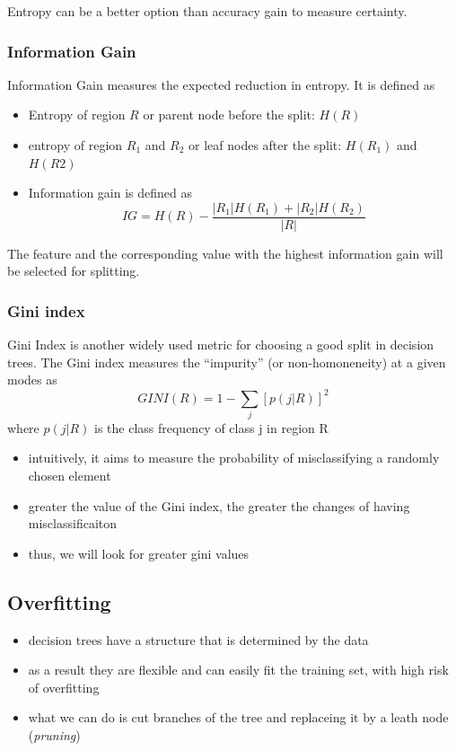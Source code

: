 \documentclass{article}
\begin{document}
Entropy can be a better option than accuracy gain to measure certainty.

\subsubsection{Information Gain}\label{information-gain}

Information Gain measures the expected reduction in entropy. It is
defined as

\begin{itemize}
\tightlist
\item
  Entropy of region \(R\) or parent node before the split: \(H(R)\)
\item
  entropy of region \(R_1\) and \(R_2\) or leaf nodes after the split:
  \(H(R_1)\) and \(H(R2)\)
\item
  Information gain is defined as
  \[IG = H(R) - \frac{|R_1|H(R_1) + |R_2|H(R_2)}{|R|}\]
\end{itemize}

The feature and the corresponding value with the highest information
gain will be selected for splitting.

\subsubsection{Gini index}\label{gini-index}

Gini Index is another widely used metric for choosing a good split in
decision trees. The Gini index measures the ``impurity'' (or
non-homoneneity) at a given modes as \[GINI(R)=1-\sum_j [p(j|R)]^2\]
where \(p(j|R)\) is the class frequency of class j in region R

\begin{itemize}
\tightlist
\item
  intuitively, it aims to measure the probability of misclassifying a
  randomly chosen element
\item
  greater the value of the Gini index, the greater the changes of having
  misclassificaiton
\item
  thus, we will look for greater gini values
\end{itemize}

\subsection{Overfitting}\label{overfitting}

\begin{itemize}
\tightlist
\item
  decision trees have a structure that is determined by the data
\item
  as a result they are flexible and can easily fit the training set,
  with high risk of overfitting
\item
  what we can do is cut branches of the tree and replaceing it by a
  leath node (\emph{pruning})
\end{itemize}
\end{document}
